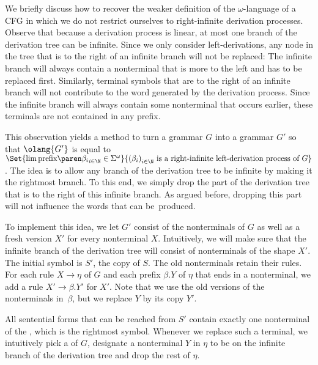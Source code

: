 \documentclass[../../diss.tex]{subfiles}
\begin{document}
\begin{remark}%
\label{Remark:OmegaCFGWeakerDefinition}%
    We briefly discuss how to recover the weaker definition of the $\omega$-language of a CFG in which we do not restrict ourselves to right-infinite derivation processes.
    Observe that because a derivation process is linear, at most one branch of the derivation tree can be infinite.
    Since we only consider left-derivations, any node in the tree that is to the right of an infinite branch will not be replaced:
    The infinite branch will always contain a nonterminal that is more to the left and has to be replaced first.
    Similarly, terminal symbols that are to the right of an infinite branch will not contribute to the word generated by the derivation process.
    Since the infinite branch will always contain some nonterminal that occurs earlier, these terminals are not contained in any prefix.

    This observation yields a method to turn a grammar $G$ into a grammar $G'$ so that $\olang{G'}$ is equal to $\Set{ \lim \tprefix{\beta_i}_{i \in \N} \in \Sigma^\omega }{ {(\beta_i)}_{i \in \N} \text{ is a right-infinite left-derivation process of } G}$.
    The idea is to allow any branch of the derivation tree to be infinite by making it the rightmost branch.
    To this end, we simply drop the part of the derivation tree that is to the right of this infinite branch.
    As argued before, dropping this part will not influence the words that can be~produced.

    To implement this idea, we let $G'$ consist of the nonterminals of $G$ as well as a fresh version $X'$ for every nonterminal $X$.
    Intuitively, we will make sure that the infinite branch of the derivation tree will consist of nonterminals of the shape $X'$.
    The initial symbol is $S'$, the copy of $S$.
    The old nonterminals retain their rules.
    For each rule $X \to \eta$ of $G$ and each prefix $\beta.Y$ of $\eta$ that ends in a nonterminal, we add a rule $X' \to \beta.Y'$ for $X'$.
    Note that we use the old versions of the nonterminals in~$\beta$, but we replace $Y$ by its copy $Y'$.

    All sentential forms that can be reached from $S'$ contain exactly one nonterminal of the , which is the rightmost symbol.
    Whenever we replace such a terminal, we intuitively pick a  of $G$, designate a nonterminal $Y$ in $\eta$ to be on the infinite branch of the derivation tree and drop the rest of $\eta$.


\end{remark}
\end{document}
